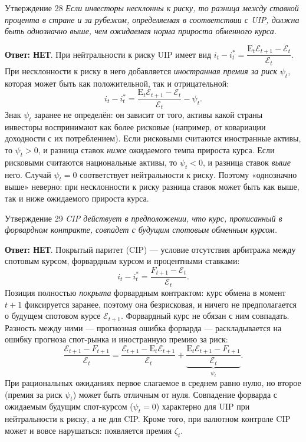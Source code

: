\documentclass[10pt,a4paper]{article}
\newcommand{\qnet}{\textbf{\color{nored}Ответ: НЕТ}}
\newenvironment{answer}[2]{%
  \begin{qbox}{Утверждение #1}
  \textit{#2}\par\smallskip
}{%
  \end{qbox}\vspace{2pt}
}
\begin{document}
\begin{answer}{28}{Если инвесторы несклонны к риску, то разница между ставкой процента в стране и за рубежом, определяемая в соответствии с UIP, должна быть однозначно выше, чем ожидаемая норма прироста обменного курса.}
\qnet. При нейтральности к риску UIP имеет вид $i_t-i_t^*=\dfrac{\mathrm{E}_t\mathcal{E}_{t+1}-\mathcal{E}_t}{\mathcal{E}_t}$. При несклонности к риску в него добавляется \emph{иностранная премия за риск} $\psi_t$, которая может быть как положительной, так и отрицательной:
\[
i_t-i_t^*=\dfrac{\mathrm{E}_t\mathcal{E}_{t+1}-\mathcal{E}_t}{\mathcal{E}_t}-\psi_t .
\]
Знак $\psi_t$ заранее не определён: он зависит от того, активы какой страны инвесторы воспринимают как более рисковые (например, от ковариации доходности с их потреблением). Если рисковыми считаются иностранные активы, то $\psi_t>0$, и разница ставок \emph{ниже} ожидаемого темпа прироста курса. Если рисковыми считаются национальные активы, то $\psi_t<0$, и разница ставок \emph{выше} него. Случай $\psi_t=0$ соответствует нейтральности к риску. Поэтому «однозначно выше» неверно: при несклонности к риску разница ставок может быть как выше, так и ниже ожидаемого прироста курса.
\end{answer}

\begin{answer}{29}{CIP действует в предположении, что курс, прописанный в форвардном контракте, совпадет с будущим спотовым обменным курсом.}
\qnet. Покрытый паритет (CIP) --- условие отсутствия арбитража между спотовым курсом, форвардным курсом и процентными ставками:
\[
i_t-i_t^*=\dfrac{F_{t+1}-\mathcal{E}_t}{\mathcal{E}_t}.
\]
Позиция полностью \emph{покрыта} форвардным контрактом: курс обмена в момент $t+1$ фиксируется заранее, поэтому она безрисковая, и ничего не предполагается о будущем спотовом курсе $\mathcal{E}_{t+1}$. Форвардный курс не обязан с ним совпадать. Разность между ними --- прогнозная ошибка форварда --- раскладывается на ошибку прогноза спот-рынка и иностранную премию за риск:
\[
\dfrac{\mathcal{E}_{t+1}-F_{t+1}}{\mathcal{E}_t}=\dfrac{\mathcal{E}_{t+1}-\mathrm{E}_t\mathcal{E}_{t+1}}{\mathcal{E}_t}+\underbrace{\dfrac{\mathrm{E}_t\mathcal{E}_{t+1}-F_{t+1}}{\mathcal{E}_t}}_{\psi_t}.
\]
При рациональных ожиданиях первое слагаемое в среднем равно нулю, но второе (премия за риск $\psi_t$) может быть отличным от нуля. Совпадение форварда с ожидаемым будущим спот-курсом ($\psi_t=0$) характерно для UIP при нейтральности к риску, а не для CIP. Кроме того, при валютном контроле CIP может и вовсе нарушаться: появляется премия $\zeta_t$.
\end{answer}
\end{document}
